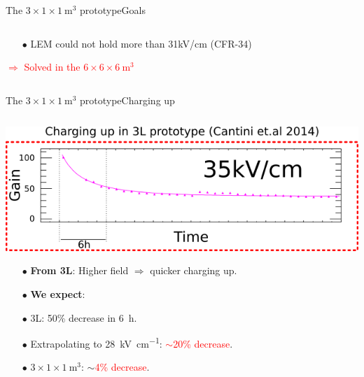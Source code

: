 \documentclass[10pt]{beamer}
\begin{document}
\begin{frame}{The \texorpdfstring{$3 \times 1 \times \SI{1}{\meter\cubed}$}{311} prototype}{Goals}
\begin{scriptsize}
\begin{columns}
\begin{column}{0.48\textwidth}
\begin{itemize}
    					\item[$\bullet$] LEM could not hold more than 31kV/cm (CFR-34)
    				\end{itemize}
    				\textcolor{red}{$\Rightarrow$ Solved in the $6 \times 6 \times \SI{6}{\meter\cubed}$}
    			\end{column}
    		\end{columns}
	    \end{scriptsize}
    \end{frame}
    
    
    \begin{frame}{The \texorpdfstring{$3 \times 1 \times \SI{1}{\meter\cubed}$}{311} prototype}{Charging up}
    	\begin{scriptsize}
    		\begin{columns}
    			\begin{column}{0.45\textwidth}
    				\includegraphics[width=\textwidth]{figures/311/3L_charging_up.png}\\
    				\vfill
    				\begin{itemize}
    					\item[$\bullet$] \textbf{From 3L}: Higher field $\Rightarrow$ quicker charging up.
    					\item[$\bullet$] \textbf{We expect}:
    					\begin{itemize}
    					\end{itemize}
    					\item[$\bullet$] 3L: 50\% decrease in \SI{6}{\hour}. 
    					\item[$\bullet$] Extrapolating to \SI{28}{\kilo\volt\per\centi\meter}: \textcolor{red}{$\sim$20\% decrease}.
    					\item[$\bullet$]  $3 \times 1 \times \SI{1}{\meter\cubed}$: $\sim$\textcolor{red}{4\% decrease}.

\end{itemize}
\end{column}
\end{columns}
\end{scriptsize}
\end{frame}
\end{document}
